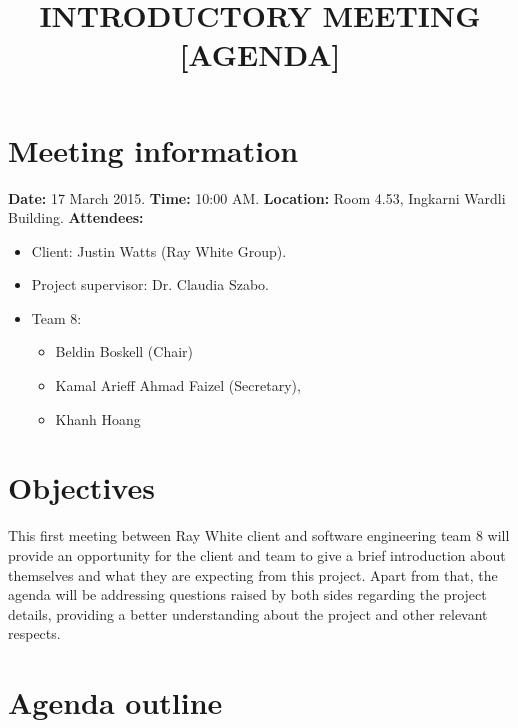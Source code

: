 \documentclass[12pt]{article}
\date{} %
\title{\textbf{INTRODUCTORY MEETING [AGENDA]}}
\begin{document}
\maketitle

\section*{Meeting information}

\textbf{Date:} 17 March 2015.\newline
\textbf{Time:} 10:00 AM.\newline
\textbf{Location:} Room 4.53, Ingkarni Wardli Building.\newline
\textbf{Attendees:}
\begin{itemize}
  \item Client: Justin Watts (Ray White Group).
  \item Project supervisor: Dr. Claudia Szabo.
  \item Team 8:
  \begin{itemize}
    \item Beldin Boskell (Chair)
    \item Kamal Arieff Ahmad Faizel (Secretary),
    \item Khanh Hoang
  \end{itemize}
\end{itemize}

\section*{Objectives}

This first meeting between Ray White client and software engineering team 8 will provide an opportunity for the client and team to give a brief introduction about themselves and what they are expecting from this project. Apart from that, the agenda will be addressing questions raised by both sides regarding the project details, providing a better understanding about the project and other relevant respects.

\section*{Agenda outline}
\end{document}
